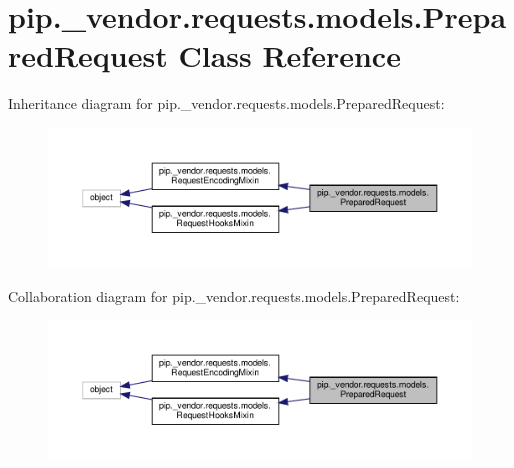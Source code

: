 \hypertarget{classpip_1_1__vendor_1_1requests_1_1models_1_1PreparedRequest}{}\section{pip.\+\_\+vendor.\+requests.\+models.\+Prepared\+Request Class Reference}
\label{classpip_1_1__vendor_1_1requests_1_1models_1_1PreparedRequest}


Inheritance diagram for pip.\+\_\+vendor.\+requests.\+models.\+Prepared\+Request\+:
\nopagebreak
\begin{figure}[H]
\begin{center}
\leavevmode
\includegraphics[width=350pt]{classpip_1_1__vendor_1_1requests_1_1models_1_1PreparedRequest__inherit__graph}
\end{center}
\end{figure}


Collaboration diagram for pip.\+\_\+vendor.\+requests.\+models.\+Prepared\+Request\+:
\nopagebreak
\begin{figure}[H]
\begin{center}
\leavevmode
\includegraphics[width=350pt]{classpip_1_1__vendor_1_1requests_1_1models_1_1PreparedRequest__coll__graph}
\end{center}
\end{figure}
